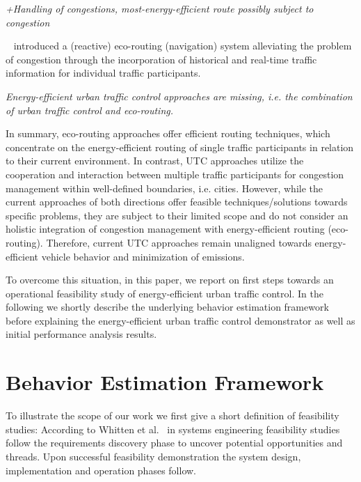 \documentclass[conference]{../cls/IEEEtran}
\begin{document}
\textit{+Handling of congestions, most-energy-efficient route possibly
subject to congestion}

 ~\cite{Boriboonsomsin2012} introduced a (reactive) eco-routing (navigation)
 system alleviating the problem of congestion through the
 incorporation of historical and real-time traffic information for individual
 traffic participants.

\textit{Energy-efficient urban traffic control approaches are
missing, i.e.
the combination of urban traffic control and eco-routing.}

In summary, eco-routing approaches offer efficient routing techniques, which
concentrate on the energy-efficient routing of single traffic participants in
relation to their current environment.  In contrast, UTC approaches utilize the
cooperation and interaction between multiple traffic participants for congestion
management within well-defined boundaries, i.e.
cities. 
However, while the current approaches of both
directions offer feasible techniques/solutions towards specific problems, they are
subject to their limited scope and do not consider an holistic integration of
congestion management with energy-efficient routing (eco-routing). Therefore,
current UTC approaches remain unaligned towards energy-efficient vehicle
behavior and minimization of emissions.

To overcome this situation, in this paper, we report on first steps towards an
operational feasibility study of energy-efficient urban traffic control.
In the following we shortly describe the underlying behavior estimation
framework before explaining the energy-efficient urban traffic control demonstrator as well as initial performance analysis results.

\section{Behavior Estimation Framework}

To illustrate the scope of our work we first give a short definition of feasibility studies: 
According to Whitten et al.~\cite{Whitten2005} in systems engineering feasibility studies follow the requirements discovery phase to uncover potential opportunities and threads.
Upon successful feasibility demonstration the system design, implementation and operation phases follow.
\end{document}
